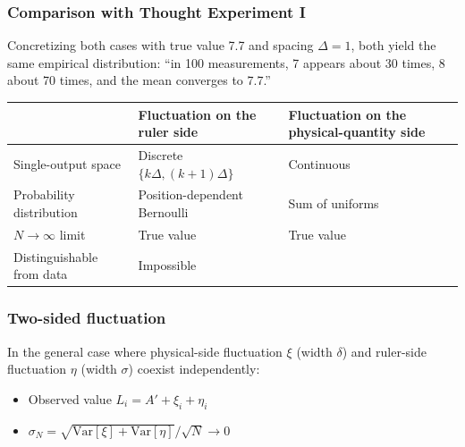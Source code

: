 \documentclass[
]{article}
\newcounter{none} %
\providecommand{\tightlist}{%
  \setlength{\itemsep}{0pt}\setlength{\parskip}{0pt}}
\begin{document}
\subsubsection{Comparison with Thought Experiment
I}\label{comparison-with-thought-experiment-i}

Concretizing both cases with true value 7.7 and spacing \(\Delta = 1\),
both yield the same empirical distribution: ``in 100 measurements, 7
appears about 30 times, 8 about 70 times, and the mean converges to
7.7.''

{\def\LTcaptype{none} %
\begin{longtable}[]{@{}
  >{\raggedright\arraybackslash}p{}
  >{\raggedright\arraybackslash}p{}
  >{\raggedright\arraybackslash}p{}@{}}
\toprule\noalign{}
\begin{minipage}[b]{\linewidth}\raggedright
\end{minipage} & \begin{minipage}[b]{\linewidth}\raggedright
Fluctuation on the ruler side
\end{minipage} & \begin{minipage}[b]{\linewidth}\raggedright
Fluctuation on the physical-quantity side
\end{minipage} \\
\midrule\noalign{}
\endhead
\bottomrule\noalign{}
\endlastfoot
Single-output space & Discrete \(\{k\Delta, (k+1)\Delta\}\) &
Continuous \\
Probability distribution & Position-dependent Bernoulli & Sum of
uniforms \\
\(N \to \infty\) limit & True value & True value \\
Distinguishable from data & Impossible & \\
\end{longtable}
}

\subsubsection{Two-sided fluctuation}\label{two-sided-fluctuation}

In the general case where physical-side fluctuation \(\xi\) (width
\(\delta\)) and ruler-side fluctuation \(\eta\) (width \(\sigma\))
coexist independently:

\begin{itemize}
\tightlist
\item
  Observed value \(L_i = A' + \xi_i + \eta_i\)
\item
  \(\sigma_N = \sqrt{\mathrm{Var}[\xi] + \mathrm{Var}[\eta]} / \sqrt{N} \to 0\)
\end{itemize}
\end{document}
